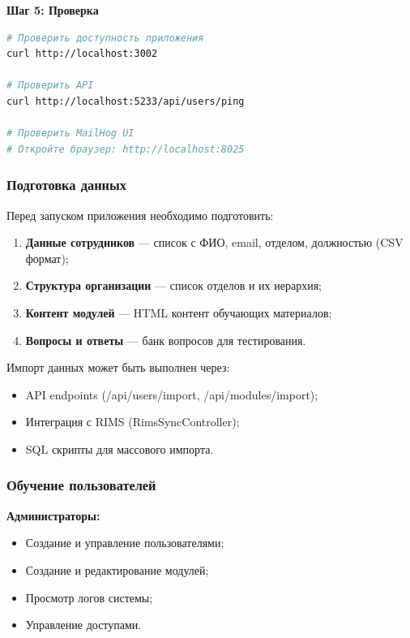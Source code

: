 \textbf{Шаг 5: Проверка}
\begin{lstlisting}[language=bash, basicstyle=\ttfamily\small]
# Проверить доступность приложения
curl http://localhost:3002

# Проверить API
curl http://localhost:5233/api/users/ping

# Проверить MailHog UI
# Откройте браузер: http://localhost:8025
\end{lstlisting}

\subsubsection{Подготовка данных}

Перед запуском приложения необходимо подготовить:

\begin{enumerate}
    \item \textbf{Данные сотрудников} --- список с ФИО, email, отделом, должностью (CSV формат);
    \item \textbf{Структура организации} --- список отделов и их иерархия;
    \item \textbf{Контент модулей} --- HTML контент обучающих материалов;
    \item \textbf{Вопросы и ответы} --- банк вопросов для тестирования.
\end{enumerate}

Импорт данных может быть выполнен через:
\begin{itemize}
    \item API endpoints (/api/users/import, /api/modules/import);
    \item Интеграция с RIMS (RimsSyncController);
    \item SQL скрипты для массового импорта.
\end{itemize}

\subsubsection{Обучение пользователей}

\textbf{Администраторы:}
\begin{itemize}
    \item Создание и управление пользователями;
    \item Создание и редактирование модулей;
    \item Просмотр логов системы;
    \item Управление доступами.
\end{itemize}

